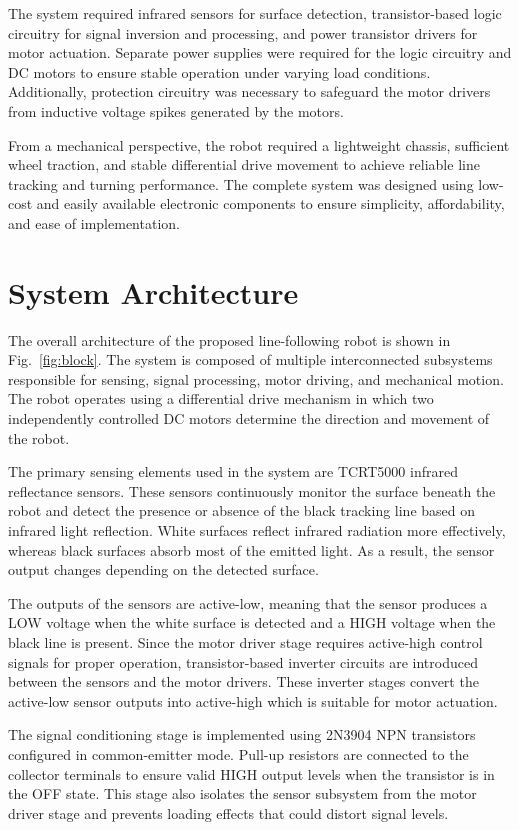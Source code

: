 \documentclass[conference]{IEEEtran}
\begin{document}
The system required infrared sensors for surface detection, transistor-based logic circuitry for signal inversion and processing, and power transistor drivers for motor actuation. Separate power supplies were required for the logic circuitry and DC motors to ensure stable operation under varying load conditions. Additionally, protection circuitry was necessary to safeguard the motor drivers from inductive voltage spikes generated by the motors.

From a mechanical perspective, the robot required a lightweight chassis, sufficient wheel traction, and stable differential drive movement to achieve reliable line tracking and turning performance. The complete system was designed using low-cost and easily available electronic components to ensure simplicity, affordability, and ease of implementation.

\section{System Architecture}


The overall architecture of the proposed line-following robot is shown in Fig.~\ref{fig:block}. The system is composed of multiple interconnected subsystems responsible for sensing, signal processing, motor driving, and mechanical motion. The robot operates using a differential drive mechanism in which two independently controlled DC motors determine the direction and movement of the robot.

The primary sensing elements used in the system are TCRT5000 infrared reflectance sensors. These sensors continuously monitor the surface beneath the robot and detect the presence or absence of the black tracking line based on infrared light reflection. White surfaces reflect infrared radiation more effectively, whereas black surfaces absorb most of the emitted light. As a result, the sensor output changes depending on the detected surface.

The outputs of the sensors are active-low, meaning that the sensor produces a LOW voltage when the white surface is detected and a HIGH voltage when the black line is present. Since the motor driver stage requires active-high control signals for proper operation, transistor-based inverter circuits are introduced between the sensors and the motor drivers. These inverter stages convert the active-low sensor outputs into active-high which is suitable for motor actuation.

The signal conditioning stage is implemented using 2N3904 NPN transistors configured in common-emitter mode. Pull-up resistors are connected to the collector terminals to ensure valid HIGH output levels when the transistor is in the OFF state. This stage also isolates the sensor subsystem from the motor driver stage and prevents loading effects that could distort signal levels.
\end{document}
